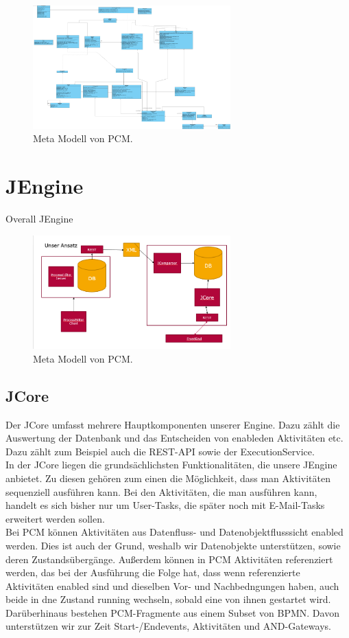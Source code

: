 \documentclass{article}
\begin{document}
\begin{figure}
\centering
\includegraphics[width=3in]{img/MetaModell_classDiagramm.jpg}
\caption{Meta Modell von PCM.}
\label{fig:PCMmetaModell}
\end{figure}

%
%
\section{JEngine}
Overall JEngine

\begin{figure}
\centering
\includegraphics[width=3in]{img/JEngine_overview.png}
\caption{Meta Modell von PCM.}
\label{fig:PCMmetaModell}
\end{figure}


%
%
\subsection{JCore}
Der JCore umfasst mehrere Hauptkomponenten unserer Engine. Dazu zählt die Auswertung der Datenbank und das Entscheiden von enableden Aktivitäten etc.\\
Dazu zählt zum Beispiel auch die REST-API sowie der ExecutionService.\\
In der JCore liegen die grundsächlichsten Funktionalitäten, die unsere JEngine anbietet. Zu diesen gehören zum einen die Möglichkeit, dass man Aktivitäten sequenziell ausführen kann. Bei den Aktivitäten, die man ausführen kann, handelt es sich bisher nur um User-Tasks, die später noch mit E-Mail-Tasks erweitert werden sollen.\\
Bei PCM können Aktivitäten aus Datenfluss- und Datenobjektflusssicht enabled werden. Dies ist auch der Grund, weshalb wir Datenobjekte unterstützen, sowie deren Zustandsübergänge. Außerdem können in PCM Aktivitäten referenziert werden, das bei der Ausführung die Folge hat, dass wenn referenzierte Aktivitäten enabled sind und dieselben Vor- und Nachbedngungen haben, auch beide in dne Zustand running wechseln, sobald eine von ihnen gestartet wird.\\
Darüberhinaus bestehen PCM-Fragmente aus einem Subset von BPMN. Davon unterstützen wir zur Zeit Start-/Endevents, Aktivitäten und AND-Gateways.
\end{document}
